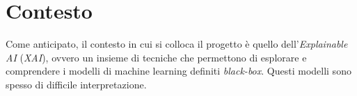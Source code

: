 \chapter{Contesto}

Come anticipato, il contesto in cui si colloca il progetto è quello
dell'\textit{Explainable AI} (\textit{XAI}), ovvero un insieme di tecniche che
permettono di esplorare e comprendere i modelli di machine learning definiti
\textit{black-box}. Questi modelli sono spesso di difficile interpretazione.